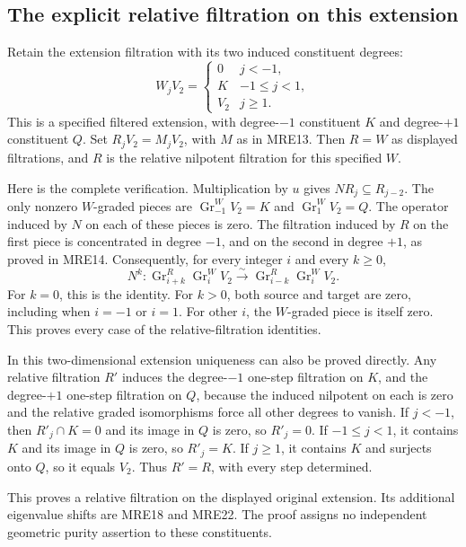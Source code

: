 \documentclass[11pt,a4paper]{article}
\begin{document}
\subsection{The explicit relative filtration on this extension}

Retain the extension filtration with its two induced constituent degrees:
\[
 W_jV_2=
 \begin{cases}
 0&j<-1,\\K&-1\leq j<1,\\V_2&j\geq1.
 \end{cases}
 \tag{MRE28}
\]
This is a specified filtered extension, with degree-\(-1\) constituent
\(K\) and degree-\(+1\) constituent \(Q\). Set \(R_jV_2=M_jV_2\), with
\(M\) as in MRE13. Then \(R=W\) as displayed filtrations, and \(R\) is
the relative nilpotent filtration for this specified \(W\).

Here is the complete verification. Multiplication by \(u\) gives
\(NR_j\subseteq R_{j-2}\). The only nonzero \(W\)-graded pieces are
\(\operatorname{Gr}_{-1}^W V_2=K\) and
\(\operatorname{Gr}_{1}^W V_2=Q\). The operator induced by \(N\) on
each of these pieces is zero. The filtration induced by \(R\) on the
first piece is concentrated in degree \(-1\), and on the second in
degree \(+1\), as proved in MRE14. Consequently, for every integer
\(i\) and every \(k\geq0\),
\[
 N^k:\operatorname{Gr}_{i+k}^R\operatorname{Gr}_i^W V_2
 \xrightarrow{\sim}
       \operatorname{Gr}_{i-k}^R\operatorname{Gr}_i^W V_2.
 \tag{MRE29}
\]
For \(k=0\), this is the identity. For \(k>0\), both source and target
are zero, including when \(i=-1\) or \(i=1\). For other \(i\), the
\(W\)-graded piece is itself zero. This proves every case of the
relative-filtration identities.

In this two-dimensional extension uniqueness can also be proved directly.
Any relative filtration \(R'\) induces the degree-\(-1\) one-step
filtration on \(K\), and the degree-\(+1\) one-step filtration on \(Q\),
because the induced nilpotent on each is zero and the relative graded
isomorphisms force all other degrees to vanish. If \(j<-1\), then
\(R'_j\cap K=0\) and its image in \(Q\) is zero, so \(R'_j=0\).
If \(-1\leq j<1\), it contains \(K\) and its image in \(Q\) is zero,
so \(R'_j=K\). If \(j\geq1\), it contains \(K\) and surjects onto
\(Q\), so it equals \(V_2\). Thus \(R'=R\), with every step determined.

This proves a relative filtration on the displayed original extension.
Its additional eigenvalue shifts are MRE18 and MRE22. The proof assigns
no independent geometric purity assertion to these constituents.
\end{document}
